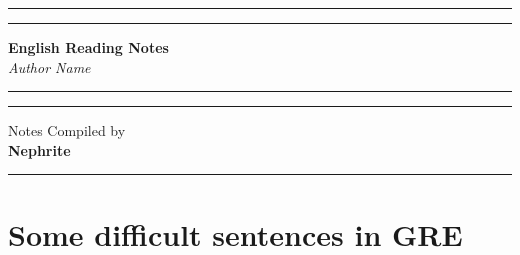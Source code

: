 \documentclass{book}
\newcommand{\booktitle}{English Reading Notes}
\newcommand{\authorname}{Author Name}
\newcommand{\yourname}{Nephrite}
\begin{document}

\begin{titlepage}
    \begin{center}
        \vspace*{2cm}

        \hrule height 3pt \vspace{2pt} \hrule height 1pt width 0.4\textwidth \vspace{1cm}

        {\Huge \textbf{\textcolor{coverblue}{\booktitle}}}\\[0.5cm]

        {\LARGE \textit{\textcolor{textgray}{\authorname}}}\\[1cm]

        \hrule height 1pt \vspace{2pt} \hrule height 3pt \vspace{3cm}

        {\Large \textcolor{textgray}{Notes Compiled by}}\\[0.5cm]
        {\LARGE \textbf{\yourname}}\\[2cm]

        \vfill
        \hrule height 1pt width 0.25\textwidth
    \end{center}
\end{titlepage}

\tableofcontents
\newpage

\chapter{Some difficult sentences in GRE}
\end{document}
